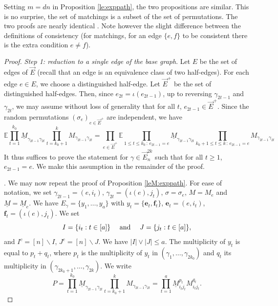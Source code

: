 \documentclass[11pt]{article}
\newcommand{\dE}{\mathbb {E}}
\newcommand{\1}{1\!\!{\sf I}}\newcommand{\IND}{\1}
\newcommand{\Be}{\bm{e}}
\newcommand{\Bf}{\bm{f}}
\begin{document}
Setting $m = dn$ in Proposition \ref{le:exppath}, the two propositions are similar. This is no surprise, the set of matchings is a subset of the set of permutations. The two proofs are nearly identical . Note however the slight difference between the definitions of consistency (for matchings, for an edge $\{ e, f\}$ to be consistent there is the extra condition $e \ne f$). 


\begin{proof}  {\em Step 1: reduction to a single edge of the base graph}. Let $E$ be the set of edges of $\vec E$ (recall that an edge is an equivalence class of two half-edges). For each edge $e \in E$, we choose a distinguished half-edge.   Let $\vec E^+$ be the set of distinguished half-edges. Then, since $e_{2t} = \iota(e_{2t-1})$, up to reversing $\gamma_{2t-1}$ and $\gamma_{2t}$, we may assume without loss of generality that for all $t$, $e_{2t-1} \in \vec E^+$.  Since the random permutations $(\sigma_{e})_{e \in \vec E^+}$ are independent,   we have
$$
\dE \prod_{t= 1} ^{k_0}  \underline M_{\gamma_{2t-1} \gamma_{2t}} \prod_{t= k_0+1} ^{k}  M_{\gamma_{2t-1} \gamma_{2t} } = \prod_{e \in \vec E^+}  \dE \prod_{1 \leq t \leq k_0 \, :\,  e_{2t-1}  = e}  \underline M_{\gamma_{2t-1} \gamma_{2t} } \prod_{k_0  +1 \leq t\leq  k \, : \,   e_{2t-1} = e }  M_{\gamma_{2t-1} \gamma_{2t}  }
$$
 It thus suffices to prove the statement for $\gamma \in \vec E_n^{2k}$ such that for all $t \geq 1$, $e_{2t-1} = e $. We make this assumption in the remainder of the proof. 


.  We may now repeat the proof of Proposition \ref{leM:exppath}. For ease of notation, we set $\gamma_{2t-1} = (e , i_t)$, $\gamma_{2t} = (\iota (e), j_t)$, $\sigma = \sigma_e$,  $M = M_e$ and $\underline M = \underline M_e$. We have $ E_\gamma = \{ y_1, \ldots , y_a  \}$ with $y_{t} = \{ \Be_t , \Bf_t  \}$, $\Be_t = (e , i_{t})$, $\Bf_t = (\iota(e), j_t)$. 
 We set
$$ I = \{ i_t : t \in [a] \} \quad \hbox{ and } \quad J = \{ j_t : t \in [a] \},$$
and $I^c = [n] \backslash I$, $J^c = [n] \backslash J$. We have $| I | \vee |J|  \leq  a$. The multiplicity of $y_t$ is equal to $p_t + q_t$, where $p_t$ is the multiplicity of $y_t$ in $(\gamma_1, \ldots, \gamma_{2k_0})$ and $q_t$ its multiplicity in $(\gamma_{2k_0 +1}, \ldots, \gamma_{2k})$.  We write 
$$
P =  \prod_{t= 1} ^{k_0}  \underline M_{\gamma_{2t-1} \gamma_{2t} } \prod_{t= k_0+1} ^{k}  M_{\gamma_{2t-1} \gamma_{2t} }  = \prod_{t=1}^a  \underline M_{i_tj_t} ^{p_t}  M_{i_tj_t} ^{q_t} . 
$$


\end{proof}
\end{document}
